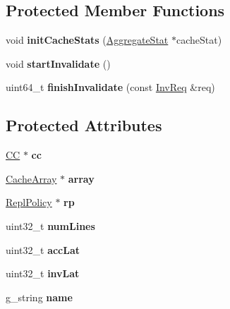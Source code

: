 \subsection*{Protected Member Functions}
\begin{DoxyCompactItemize}
\item 
\hypertarget{classCache_a6f04561d53efc7623c809e6c885d8c09}{void {\bfseries init\-Cache\-Stats} (\hyperlink{classAggregateStat}{Aggregate\-Stat} $\ast$cache\-Stat)}\label{classCache_a6f04561d53efc7623c809e6c885d8c09}

\item 
\hypertarget{classCache_acd207b095f2b950d8887a1f9614f994b}{void {\bfseries start\-Invalidate} ()}\label{classCache_acd207b095f2b950d8887a1f9614f994b}

\item 
\hypertarget{classCache_abde65d6c87557ccdf3557e6da05dcb7c}{uint64\-\_\-t {\bfseries finish\-Invalidate} (const \hyperlink{structInvReq}{Inv\-Req} \&req)}\label{classCache_abde65d6c87557ccdf3557e6da05dcb7c}

\end{DoxyCompactItemize}
\subsection*{Protected Attributes}
\begin{DoxyCompactItemize}
\item 
\hypertarget{classCache_a279fee4d6cedcfb14394e6971be01978}{\hyperlink{classCC}{C\-C} $\ast$ {\bfseries cc}}\label{classCache_a279fee4d6cedcfb14394e6971be01978}

\item 
\hypertarget{classCache_a2af76891495aab963a368ffd9ccde010}{\hyperlink{classCacheArray}{Cache\-Array} $\ast$ {\bfseries array}}\label{classCache_a2af76891495aab963a368ffd9ccde010}

\item 
\hypertarget{classCache_a93822b507943d4a2383ad83e1d706582}{\hyperlink{classReplPolicy}{Repl\-Policy} $\ast$ {\bfseries rp}}\label{classCache_a93822b507943d4a2383ad83e1d706582}

\item 
\hypertarget{classCache_a0d43aadafe65c0753c8656f315e27a8d}{uint32\-\_\-t {\bfseries num\-Lines}}\label{classCache_a0d43aadafe65c0753c8656f315e27a8d}

\item 
\hypertarget{classCache_acec1448a346c8ebf5412d4ba0d8f0645}{uint32\-\_\-t {\bfseries acc\-Lat}}\label{classCache_acec1448a346c8ebf5412d4ba0d8f0645}

\item 
\hypertarget{classCache_adeafa997d10220f79e5cf85c1c3ab46e}{uint32\-\_\-t {\bfseries inv\-Lat}}\label{classCache_adeafa997d10220f79e5cf85c1c3ab46e}

\item 
\hypertarget{classCache_a85342a02c0ac63167a48b6792e13e8d9}{g\-\_\-string {\bfseries name}}\label{classCache_a85342a02c0ac63167a48b6792e13e8d9}

\end{DoxyCompactItemize}


